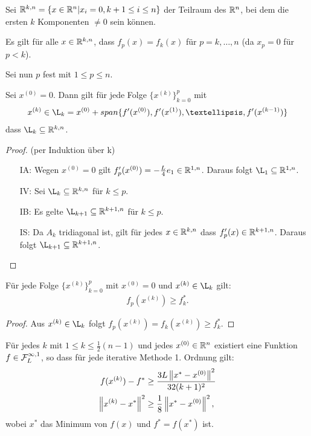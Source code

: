 \begin{Definition}
Sei $\mathbb R^{k,n} = \{x\in\mathbb R^n | x_i = 0, k+1 \leq i \leq n \}$ der Teilraum des $\mathbb R^n$, bei dem die ersten $k$ Komponenten $\neq 0$ sein können.
\end{Definition}

Es gilt für alle $x \in \mathbb R^{k,n}$, dass $f_p(x) = f_k(x)$  für $p = k,…,n$ (da $x_p=0$ für $p<k$).

Sei nun $p$ fest mit $1 \leq p \leq n$.

\begin{Lemma}
Sei $x^{(0)} = 0$. Dann gilt für jede Folge $\{x^{(k)}\}_{k=0}^p$ mit
\begin{align*}
x^{(k)} \in \L_k = x^{(0)} + span\{ f'(x^{(0)}), f'(x^{(1)}), …, f'(x^{(k-1)})\}
\end{align*}
dass $\L_k \subseteq \R^{k,n}$.
\end{Lemma}
\begin{proof} (per Induktion über k)
\begin{itemize}
\item[IA:]
Wegen $x^{(0)}=0$ gilt $f'_p(x^{(0)}) = -\frac{L}{4}e_1 \in \mathbb R^{1,n}$. Daraus folgt $\L_1 \subseteq \R^{1,n}$.
\item[IV:]
Sei $\L_k \subseteq \R^{k,n}$ für $k \leq p$.
\item[IB:]
Es gelte $\L_{k+1} \subseteq \R^{k+1,n}$ für $k \leq p$.
\item[IS:]
Da $A_k$ tridiagonal ist, gilt für jedes $x \in \mathbb R^{k,n}$ dass $f'_p(x) \in \mathbb R^{k+1,n}$. Daraus folgt $\L_{k+1} \subseteq \R^{k+1,n}$.
\end{itemize}
\end{proof}

\begin{Lemma}
Für jede Folge $\{x^{(k)}\}_{k=0}^p$ mit $x^{(0)}=0$ und $x^{(k)} \in \L_k$ gilt:
\begin{align*}
f_p(x^{(k)}) \geq f_k^*.
\end{align*}
\end{Lemma}

\begin{proof}
Aus $x^{(k)} \in \L_k$ folgt $f_p(x^{(k)}) = f_k(x^{(k)}) \geq f_k^*$.
\end{proof}


\begin{Theorem}
Für jedes $k$ mit $1\leq k \leq \frac{1}{2} (n - 1)$ und jedes $x^{(0)} \in \mathbb R^n$ existiert eine Funktion $f \in \mathcal{F}_L^{\infty, 1}$, so dass für jede iterative Methode 1. Ordnung gilt:
\begin{align*}
f(x^{(k)}) - f^* &\geq \frac{3L \left\lVert x^*-x^{(0)}\right\rVert^2}{32 (k + 1)^2}\\
\left\lVert x^{(k)} - x^*\right\rVert^2 &\geq \frac{1}{8} \left\lVert x^* - x^{(0)}\right\rVert^2,
\end{align*}
wobei $x^*$ das Minimum von $f(x)$ und $f^* = f(x^*)$ ist.
\end{Theorem}

